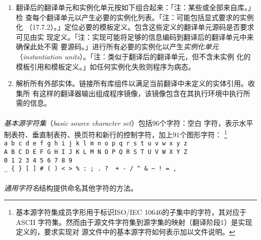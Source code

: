\begin{enumerate}[label={\arabic*}]
{    产生的标记作为翻译单元进行语法和语义分析。「注：分析与翻译标记的过程可能偶尔
    会有一个标记被替换成其他标记序列的情况（17.2）。」「注：源文件，翻译单元和翻
    译后的翻译单元不一定存成文件，这些实体与外部表示间也不一定存在一一对应关系。
    描述只是概念上的，且不指定某一特定实现。」}
  \item{翻译后的翻译单元和实例化单元按如下组合起来：「注：某些或全部来自库。」检
    查每个翻译单元以产生必要的实例化列表。「注：可能包括显式要求的实例化
    （17.7.2）。」定位必要的模板定义。包含这些定义的翻译单元源码是否要求可见由实
    现定义。「注：实现可能将足够的信息编码到翻译后的翻译单元中来确保此处不需
    要源码。」进行所有必要的实例化以产生\textit{实例化单元}
    （\textit{instantiation units}）。「注：类似于翻译后的翻译单元，但不含未实例
    化的模板引用和模板定义。」如任何实例化失败则程序为病态。}
  \item{解析所有外部实体。链接所有库组件以满足当前翻译中未定义的实体引用。收集所
    有这样的翻译器输出组成程序镜像，该镜像包含在其执行环境中执行所需的信息。}
\end{enumerate}

\paragraph{}
\textit{基本源字符集}（\textit{basic source character set}）包括$96$个字符：空白
字符，表示水平制表符、垂直制表符、换页符和新行的控制字符，加上$91$个图形字符：
\footnote{基本源字符集成员字形用于标识ISO/IEC 10646的子集中的字符，其对应于ASCII
字符集。然而由于源文件字符集到源字集的映射（翻译阶段1）是实现定义的，要求实现对
源文件中的基本源字符如何表示加以文件说明。}                                   \\
\mbox{\qquad \texttt{a b c d e f g h i j k l m n o p q r s t u v w x y z}}    \\
\mbox{\qquad \texttt{A B C D E F G H I J K L M N O P Q R S T U V W X Y Z}}    \\
\mbox{\qquad \texttt{0 1 2 3 4 5 6 7 8 9}}                                    \\
\mbox{\qquad \texttt{\_ \{ \} [ ] \# ( ) \textless{} \textgreater{} \% :\ ; .\
?\ \textasteriskcentered{} + - / \textasciicircum{} \& \textbar{}
\textasciitilde{} !\ = , \bslh{} \qdbl{} \qsgl}}

\paragraph{}
\textit{通用字符名}结构提供命名其他字符的方法。

